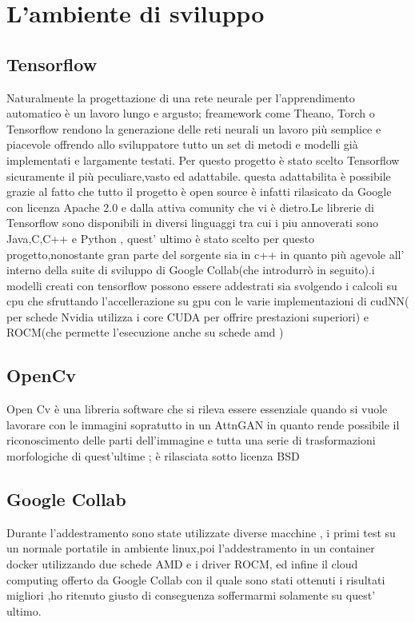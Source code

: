 \section{L'ambiente di sviluppo}



\subsection{Tensorflow}
Naturalmente la progettazione di una rete neurale per l’apprendimento automatico è un lavoro lungo e argusto;
freamework come Theano, Torch o Tensorflow  rendono la generazione delle reti neurali un lavoro più semplice e piacevole offrendo allo sviluppatore tutto un set di metodi e modelli già implementati e largamente testati.
Per questo progetto è stato scelto Tensorflow sicuramente il più peculiare,vasto ed adattabile.
questa adattabilita è possibile  grazie al fatto che tutto il progetto è open source è infatti rilasicato da Google con licenza Apache 2.0 e dalla attiva comunity che vi è dietro.Le librerie di Tensorflow sono  disponibili in diversi linguaggi tra cui i piu annoverati sono Java,C,C++ e Python , quest' ultimo è stato scelto per questo progetto,nonostante gran parte del sorgente sia in c++ in quanto più agevole all' interno della suite di sviluppo di Google Collab(che introdurrò in seguito).i modelli creati con tensorflow possono essere addestrati sia svolgendo i calcoli su cpu che sfruttando l'accellerazione su gpu con le varie implementazioni di cudNN( per schede Nvidia utilizza i core CUDA  per offrire prestazioni superiori) e ROCM(che permette l'esecuzione anche su schede amd  )

\subsection{OpenCv}
Open Cv è una libreria software che si rileva essere essenziale quando si vuole lavorare con le immagini sopratutto in un AttnGAN in quanto rende possibile il riconoscimento delle parti dell'immagine e tutta una serie di trasformazioni morfologiche di quest'ultime ; è rilasciata sotto licenza BSD 




\subsection{Google Collab}
Durante l'addestramento sono state utilizzate diverse macchine , i primi test su un normale portatile in ambiente linux,poi l'addestramento in un container docker utilizzando due schede AMD e i driver ROCM, ed infine il cloud computing offerto da Google Collab con il quale sono stati ottenuti i risultati migliori ,ho ritenuto giusto di conseguenza soffermarmi solamente su quest' ultimo.

